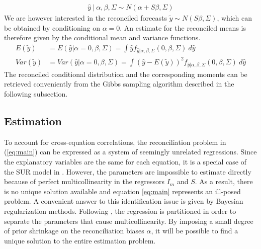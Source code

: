 \documentclass[a4paper,fleqn,11pt]{article}
\begin{document}
\begin{align}
\hat{y}\ |\ \alpha,\beta,\Sigma \sim N(\alpha + S\beta,\Sigma)
\end{align}
We are however interested in the reconciled forecasts $\tilde{y} \sim N(S\beta,\Sigma)$, which can be obtained by conditioning on $\alpha = 0$. An estimate for the reconciled means is therefore given by the conditional mean and variance functions.
\begin{align*}
E(\tilde{y}) &= E(\hat{y}|\alpha = 0,\beta,\Sigma) = \int \hat{y} f_{\hat{y}|\alpha,\beta,\Sigma}(0,\beta,\Sigma)\ d\hat{y} \\
Var(\tilde{y}) &= Var(\hat{y}|\alpha = 0,\beta,\Sigma) =  \int (\hat{y} - E(\tilde{y}))^2 f_{\hat{y}|\alpha,\beta,\Sigma}(0,\beta,\Sigma)\ d\hat{y}
\end{align*}
The reconciled conditional distribution and the corresponding moments can be retrieved conveniently from the Gibbs sampling algorithm described in the following subsection.\\

\subsection{Estimation}
To account for cross-equation correlations, the reconciliation problem in (\ref{eq:main}) can be expressed as a system of seemingly unrelated regressions. Since the explanatory variables are the same for each equation, it is a special case of the SUR model in \cite{Zellner1962}. However, the parameters are impossible to estimate directly because of perfect multicollinearity in the regressors $I_m$ and $S$. As a result, there is no unique solution available and equation \ref{eq:main} represents an ill-posed problem. A convenient answer to this identification issue is given by Bayesian regularization methods. Following \cite{Farebrother1978}, the regression is partitioned in order to separate the parameters that cause multicollinearity. By imposing a small degree of prior shrinkage on the reconciliation biases $\alpha$, it will be possible to find a unique solution to the entire estimation problem.\\
\end{document}
